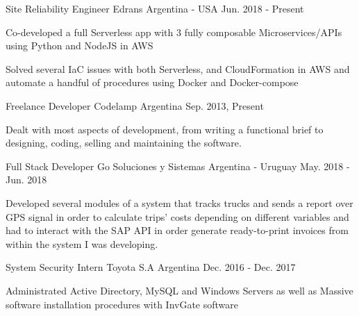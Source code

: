 

\begin{cventries}
\cventry
{Site Reliability Engineer} %
{Edrans} %
{Argentina - USA} %
{Jun. 2018 - Present} %
{
\begin{cvitems} %
\item {Co-developed a full Serverless app with 3 fully composable Microservices/APIs using Python and NodeJS in AWS}
\item {Solved several IaC issues with both Serverless, and CloudFormation in AWS and automate a handful of procedures using Docker and Docker-compose}
\end{cvitems}
}

\cventry
{Freelance Developer} %
{Codelamp} %
{Argentina} %
{Sep. 2013, Present} %
{
\begin{cvitems}
    \item {Dealt with most aspects of development, from writing a functional brief to designing, coding, selling and maintaining the software.}
\end{cvitems}
}

\cventry
{Full Stack Developer} %
{Go Soluciones y Sistemas} %
{Argentina - Uruguay} %
{May. 2018 - Jun. 2018} %
{
\begin{cvitems} %
\item {Developed several modules of a system that tracks trucks and sends a report over GPS signal in order to calculate trips' costs depending on different variables and had to interact with the SAP API in order generate ready-to-print invoices from within the system I was developing.}
\end{cvitems}
}

\cventry
{System Security Intern} %
{Toyota S.A} %
{Argentina} %
{Dec. 2016 - Dec. 2017} %
{
\begin{cvitems} %
\item {Administrated Active Directory, MySQL and Windows Servers as well as Massive software installation procedures with InvGate software}
\end{cvitems}
}
\end{cventries}
